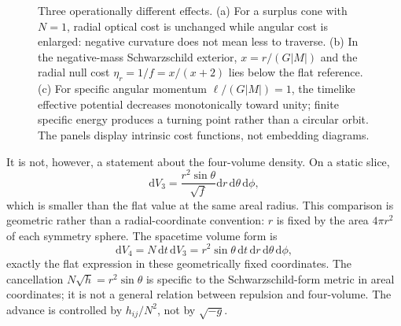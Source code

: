 \documentclass[aps,prd,twocolumn,amsmath,amssymb,nofootinbib]{revtex4-2}
\newcommand{\dd}{\mathrm{d}}
\newcommand{\eff}{\mathrm{eff}}
\begin{document}
\begin{figure}[t]
\caption{Three operationally different effects.  (a) For a surplus cone with
$N=1$, radial optical cost is unchanged while angular cost is enlarged:
negative curvature does not mean less to traverse.  (b) In the negative-mass
Schwarzschild exterior, $x=r/(G|M|)$ and the radial null cost
$\eta_r=1/f=x/(x+2)$ lies below the flat reference.  (c) For specific angular
momentum $\ell/(G|M|)=1$, the timelike effective potential decreases
monotonically toward unity; finite specific energy produces a turning point
rather than a circular orbit.  The panels display intrinsic cost functions,
not embedding diagrams.}
\label{fig:costcomparison}
\end{figure}

It is not, however, a statement about the four-volume density.  On a static
slice,
\begin{equation}
 \dd V_3=\frac{r^2\sin\theta}{\sqrt f}
 \dd r\,\dd\theta\,\dd\phi,
 \label{eq:spatialvolume}
\end{equation}
which is smaller than the flat value at the same areal radius.  This comparison
is geometric rather than a radial-coordinate convention: $r$ is fixed by the
area $4\pi r^2$ of each symmetry sphere.  The spacetime volume form is
\begin{equation}
 \dd V_4=N\,\dd t\,\dd V_3
 =r^2\sin\theta\,
 \dd t\,\dd r\,\dd\theta\,\dd\phi,
 \label{eq:fourvolume}
\end{equation}
exactly the flat expression in these geometrically fixed coordinates.  The
cancellation $N\sqrt{h}=r^2\sin\theta$ is specific to the Schwarzschild-form
metric in areal coordinates; it is not a general relation between repulsion
and four-volume.  The advance is controlled by $h_{ij}/N^2$, not by
$\sqrt{-g}$.
\end{document}
